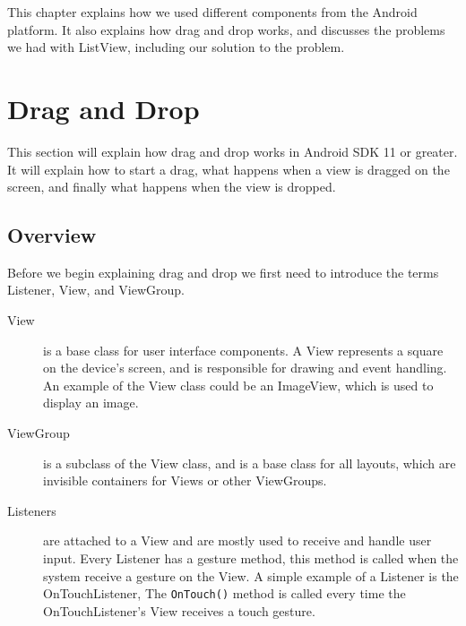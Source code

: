 This chapter explains how we used different components from the Android platform. It also explains how drag and drop works, and discusses the problems we had with ListView, including our solution to the problem.
\section{Drag and Drop}
\label{sec:androiddraganddrop}
This section will explain how drag and drop works in Android SDK 11 or greater\citep{androiddraganddropguide}. It will explain how to start a drag, what happens when a view is dragged on the screen, and finally what happens when the view is dropped.

\subsection*{Overview}

Before we begin explaining drag and drop we first need to introduce the terms Listener, View, and ViewGroup.
\begin{description}
\item[View] is a base class for user interface components. A View represents a square on the device's screen, and is responsible for drawing and event handling. An example of the View class could be an ImageView, which is used to display an image.

\item[ViewGroup] is a subclass of the View class, and is a base class for all layouts, which are invisible containers for Views or other ViewGroups.

\item[Listeners] are attached to a View and are mostly used to receive and handle user input. Every Listener has a gesture method, this method is called when the system receive a gesture on the View. A simple example of a Listener is the OnTouchListener, The \lstinline|OnTouch()| method is called every time the OnTouchListener's View receives a touch gesture.
\end{description}

